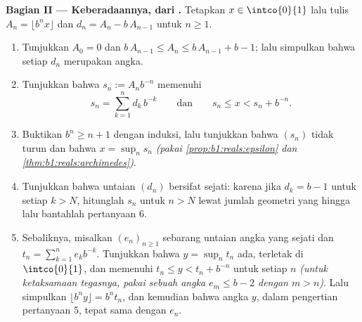 \begin{problem}
\medskip
\noindent\textbf{Bagian II --- Keberadaannya, dari .} Tetapkan
$x \in \intco{0}{1}$ lalu tulis $A_n = \lfloor b^n x \rfloor$ dan
$d_n = A_n - b\,A_{n-1}$ untuk $n \geq 1$.
\begin{enumerate}[resume]
  \item Tunjukkan $A_0 = 0$ dan $b\,A_{n-1} \leq A_n \leq b\,A_{n-1} +
        b - 1$; lalu simpulkan bahwa setiap $d_n$ merupakan angka.
  \item Tunjukkan bahwa $s_n := A_n b^{-n}$ memenuhi
        \[
        s_n = \sum_{k=1}^{n} d_k\,b^{-k}
        \qquad\text{dan}\qquad
        s_n \leq x < s_n + b^{-n} .
        \]
  \item Buktikan $b^n \geq n + 1$ dengan induksi, lalu tunjukkan bahwa
        $(s_n)$ tidak turun dan bahwa $x = \sup_n s_n$
        \emph{(pakai \cref{prop:b1:reals:epsilon} dan
        \cref{thm:b1:reals:archimedes})}.
  \item Tunjukkan bahwa untaian $(d_n)$ bersifat sejati: karena jika $d_k = b - 1$
        untuk setiap $k > N$, hitunglah $s_n$ untuk $n > N$ lewat jumlah
        geometri yang hingga lalu bantahlah pertanyaan 6.
  \item Sebaliknya, misalkan $(e_n)_{n \geq 1}$ sebarang untaian angka
        yang sejati dan $t_n = \sum_{k=1}^n e_k b^{-k}$. Tunjukkan bahwa $y
        = \sup_n t_n$ ada, terletak di $\intco{0}{1}$, dan
        memenuhi $t_n \leq y < t_n + b^{-n}$ untuk setiap $n$
        \emph{(untuk ketaksamaan tegasnya, pakai sebuah angka $e_m \leq b
        - 2$ dengan $m > n$)}. Lalu simpulkan $\lfloor b^n y \rfloor = b^n
        t_n$, dan kemudian bahwa angka $y$, dalam pengertian
        pertanyaan 5, tepat sama dengan $e_n$.
\end{enumerate}


\end{problem}
